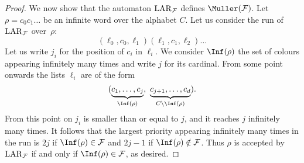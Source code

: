 \begin{proof}
We now show that the automaton $\mathrm{LAR}_{\mathcal{F}}$ defines $\Muller(\F)$.
Let $\rho = c_0 c_1 \dots$ be an infinite word over the alphabet $C$. 
Let us consider the run of $\mathrm{LAR}_{\mathcal{F}}$ over~$\rho$:
\[
(\ell_0,c_0,\ell_1) (\ell_1,c_1,\ell_2) \dots
\]
Let us write $j_i$ for the position of $c_i$ in $\ell_i$.
We consider $\Inf(\rho)$ the set of colours appearing infinitely many times and write $j$ for its cardinal.
From some point onwards the lists $\ell_i$ are of the form 
\[
(\underbrace{c_1,\dots,c_j}_{\Inf(\rho)} ,\ \underbrace{c_{j + 1},\dots,c_d}_{C \setminus \Inf(\rho)}).
\]
From this point on $j_i$ is smaller than or equal to $j$, and it reaches $j$ infinitely many times.
It follows that the largest priority appearing infinitely many times in the run is $2 j$ if $\Inf(\rho) \in \F$
and $2 j - 1$ if $\Inf(\rho) \notin \F$.
Thus $\rho$ is accepted by $\mathrm{LAR}_{\mathcal{F}}$ if and only if $\Inf(\rho) \in \F$, as desired.
\end{proof}

